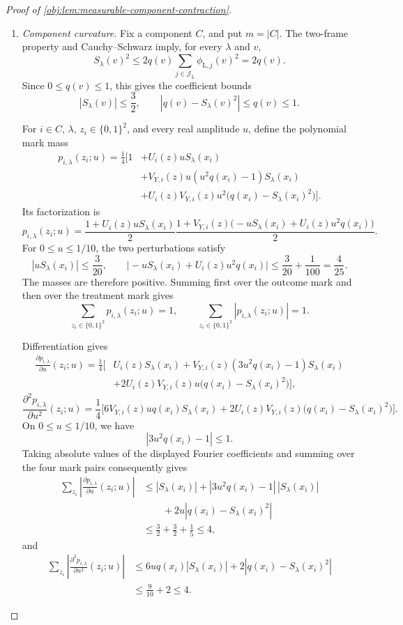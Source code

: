 \documentclass[11pt]{article}
\begin{document}
\begin{proof}[Proof of \cref{obj:lem:measurable-component-contraction}]
\begin{enumerate}
\item \textit{Component curvature.}
Fix a component \(C\), and put \(m=|C|\). The two-frame property and Cauchy--Schwarz imply, for every \(\lambda\) and \(v\),
\[
S_\lambda(v)^2
\le
2q(v)\sum_{j\in\mathcal J_{\mathrm L}}\phi_{\mathrm L,j}(v)^2
=2q(v).
\]
Since \(0\le q(v)\le1\), this gives the coefficient bounds
\[
|S_\lambda(v)|\le\frac32,
\qquad
|q(v)-S_\lambda(v)^2|\le q(v)\le1.
\]

For \(i\in C\), \(\lambda\), \(z_i\in\{0,1\}^2\), and every real amplitude \(u\), define the polynomial mark mass
\[
\begin{aligned}
p_{i,\lambda}(z_i;u)
=\frac14\bigl[
1
&+U_i(z)uS_\lambda(x_i)\\
&+V_{Y,i}(z)u(u^2q(x_i)-1)S_\lambda(x_i)\\
&+U_i(z)V_{Y,i}(z)u^2
   \bigl(q(x_i)-S_\lambda(x_i)^2\bigr)
\bigr].
\end{aligned}
\]
Its factorization is
\[
p_{i,\lambda}(z_i;u)
=
\frac{1+U_i(z)uS_\lambda(x_i)}2
\frac{1+V_{Y,i}(z)
 \bigl(-uS_\lambda(x_i)+U_i(z)u^2q(x_i)\bigr)}2.
\]
For \(0\le u\le1/10\), the two perturbations satisfy
\[
|uS_\lambda(x_i)|\le\frac3{20},
\qquad
\bigl|-uS_\lambda(x_i)+U_i(z)u^2q(x_i)\bigr|
\le\frac3{20}+\frac1{100}
=\frac4{25}.
\]
The masses are therefore positive. Summing first over the outcome mark and then over the treatment mark gives
\[
\sum_{z_i\in\{0,1\}^2}p_{i,\lambda}(z_i;u)=1,
\qquad
\sum_{z_i\in\{0,1\}^2}|p_{i,\lambda}(z_i;u)|=1.
\]

Differentiation gives
\[
\begin{aligned}
\frac{\partial p_{i,\lambda}}{\partial u}(z_i;u)
=\frac14\bigl[
&U_i(z)S_\lambda(x_i)
+V_{Y,i}(z)(3u^2q(x_i)-1)S_\lambda(x_i)\\
&+2U_i(z)V_{Y,i}(z)u
 \bigl(q(x_i)-S_\lambda(x_i)^2\bigr)
\bigr],
\end{aligned}
\]
\[
\frac{\partial^2p_{i,\lambda}}{\partial u^2}(z_i;u)
=\frac14\bigl[
6V_{Y,i}(z)u q(x_i)S_\lambda(x_i)
+2U_i(z)V_{Y,i}(z)
 \bigl(q(x_i)-S_\lambda(x_i)^2\bigr)
\bigr].
\]
On \(0\le u\le1/10\), we have
\[
|3u^2q(x_i)-1|\le1.
\]
Taking absolute values of the displayed Fourier coefficients and summing over the four mark pairs consequently gives
\[
\begin{aligned}
\sum_{z_i}
 \left|\frac{\partial p_{i,\lambda}}{\partial u}(z_i;u)\right|
&\le
|S_\lambda(x_i)|
+|3u^2q(x_i)-1|\,|S_\lambda(x_i)|\\
&\qquad
+2u|q(x_i)-S_\lambda(x_i)^2|\\
&\le \frac32+\frac32+\frac15
\le4,
\end{aligned}
\]
and
\[
\begin{aligned}
\sum_{z_i}
 \left|\frac{\partial^2p_{i,\lambda}}{\partial u^2}(z_i;u)\right|
&\le
6u q(x_i)|S_\lambda(x_i)|
+2|q(x_i)-S_\lambda(x_i)^2|\\
&\le\frac9{10}+2
\le4.
\end{aligned}
\]


\end{enumerate}
\end{proof}
\end{document}
